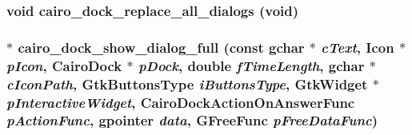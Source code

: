\subsubsection{\setlength{\rightskip}{0pt plus 5cm}void cairo\_\-dock\_\-replace\_\-all\_\-dialogs (void)}\label{cairo-dock-dialogs_8c_b7e2efc6b1cf310c8085f90cd74e3697}


\subsubsection{$\ast$ cairo\_\-dock\_\-show\_\-dialog\_\-full (const gchar $\ast$ {\em c\-Text}, {\bf Icon} $\ast$ {\em p\-Icon}, {\bf Cairo\-Dock} $\ast$ {\em p\-Dock}, double {\em f\-Time\-Length}, gchar $\ast$ {\em c\-Icon\-Path}, Gtk\-Buttons\-Type {\em i\-Buttons\-Type}, Gtk\-Widget $\ast$ {\em p\-Interactive\-Widget}, {\bf Cairo\-Dock\-Action\-On\-Answer\-Func} {\em p\-Action\-Func}, gpointer {\em data}, GFree\-Func {\em p\-Free\-Data\-Func})}\label{cairo-dock-dialogs_8c_9c468538e565243b2b485feec8656006}


